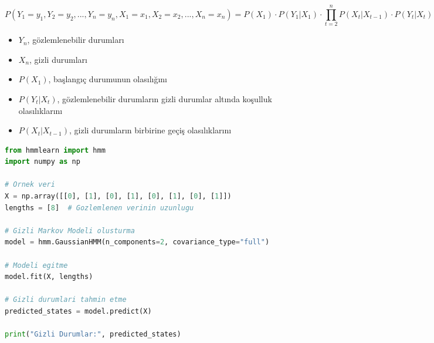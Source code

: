 \[P(Y_1=y_1, Y_2=y_2, ..., Y_n=y_n, X_1=x_1, X_2=x_2, ..., X_n=x_n) = P(X_1) \cdot P(Y_1|X_1) \cdot \prod_{t=2}^{n} P(X_t|X_{t-1}) \cdot P(Y_t|X_t)\]
\begin{itemize}
    \item $Y_{n}$, gözlemlenebilir durumları
    \item $X_{n}$, gizli durumları
    \item $P(X_1)$, başlangıç durumunun olasılığını
    \item $P(Y_{t} | X_{t})$, gözlemlenebilir durumların gizli durumlar altında koşulluk olasılıklarını
    \item $P(X_{t} | X_{t-1})$, gizli durumların birbirine geçiş olasılıklarını
\end{itemize}

\begin{lstlisting}[language=Python]
from hmmlearn import hmm
import numpy as np

# Ornek veri
X = np.array([[0], [1], [0], [1], [0], [1], [0], [1]])
lengths = [8]  # Gozlemlenen verinin uzunlugu

# Gizli Markov Modeli olusturma
model = hmm.GaussianHMM(n_components=2, covariance_type="full")

# Modeli egitme
model.fit(X, lengths)

# Gizli durumlari tahmin etme
predicted_states = model.predict(X)

print("Gizli Durumlar:", predicted_states)
\end{lstlisting}

\newpage